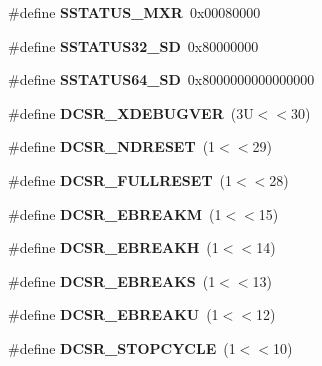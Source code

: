 \begin{DoxyCompactItemize}
\#define {\bfseries S\+S\+T\+A\+T\+U\+S\+\_\+\+M\+XR}~0x00080000
\item 
\mbox{\label{riscv-utility_8h_a5f2248b3f4a648ce63c0468a92132971}} 
\#define {\bfseries S\+S\+T\+A\+T\+U\+S32\+\_\+\+SD}~0x80000000
\item 
\mbox{\label{riscv-utility_8h_a517c9ab9421f99b99f5da4d549177f38}} 
\#define {\bfseries S\+S\+T\+A\+T\+U\+S64\+\_\+\+SD}~0x8000000000000000
\item 
\mbox{\label{riscv-utility_8h_a966a5f66e8f82245a23754d953272e26}} 
\#define {\bfseries D\+C\+S\+R\+\_\+\+X\+D\+E\+B\+U\+G\+V\+ER}~(3\+U$<$$<$30)
\item 
\mbox{\label{riscv-utility_8h_a70f0772b052aba7d37433a6abc524a05}} 
\#define {\bfseries D\+C\+S\+R\+\_\+\+N\+D\+R\+E\+S\+ET}~(1$<$$<$29)
\item 
\mbox{\label{riscv-utility_8h_ae0060c3218daba2cfe6b3a74eaa8004e}} 
\#define {\bfseries D\+C\+S\+R\+\_\+\+F\+U\+L\+L\+R\+E\+S\+ET}~(1$<$$<$28)
\item 
\mbox{\label{riscv-utility_8h_aee469b64e88766dd85645de42b9f2a5c}} 
\#define {\bfseries D\+C\+S\+R\+\_\+\+E\+B\+R\+E\+A\+KM}~(1$<$$<$15)
\item 
\mbox{\label{riscv-utility_8h_a113e941ee7b34c40b794e5b39638f79c}} 
\#define {\bfseries D\+C\+S\+R\+\_\+\+E\+B\+R\+E\+A\+KH}~(1$<$$<$14)
\item 
\mbox{\label{riscv-utility_8h_aa06fd020c5e6a4bc5e97715763eb85ff}} 
\#define {\bfseries D\+C\+S\+R\+\_\+\+E\+B\+R\+E\+A\+KS}~(1$<$$<$13)
\item 
\mbox{\label{riscv-utility_8h_ac6c4bbab3051160066b73951e0c58e84}} 
\#define {\bfseries D\+C\+S\+R\+\_\+\+E\+B\+R\+E\+A\+KU}~(1$<$$<$12)
\item 
\mbox{\label{riscv-utility_8h_a7367ccfe98195ecdf126ea1f26f85b37}} 
\#define {\bfseries D\+C\+S\+R\+\_\+\+S\+T\+O\+P\+C\+Y\+C\+LE}~(1$<$$<$10)
\item 

\end{DoxyCompactItemize}
